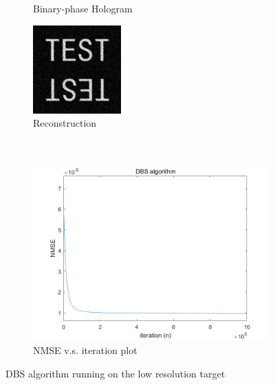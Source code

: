 \begin{figure}[H]
\begin{subfigure}[t]{0.3\textwidth}
    \caption{Binary-phase Hologram}
    \label{fig:DBS_test_128_Holo}
  \end{subfigure}
  \hfill
  \begin{subfigure}[t]{0.3\textwidth}
    \centering
    \includegraphics[width=\textwidth]{DBS_test_128_recon_intensity.png}
    \caption{Reconstruction}
    \label{fig:DBS_test_128_recon_intensity}
  \end{subfigure}
  \\
  \begin{subfigure}[t]{0.7\textwidth}
    \centering
    \includegraphics[width=\textwidth]{DBS_test_128_convergence.png}
    \caption{NMSE v.s. iteration plot}
    \label{fig:DBS_test_128_convergence}
  \end{subfigure}
  \caption{DBS algorithm running on the low resolution target}
  \label{fig:DBS algorithm running on the low resolution target}
\end{figure}

